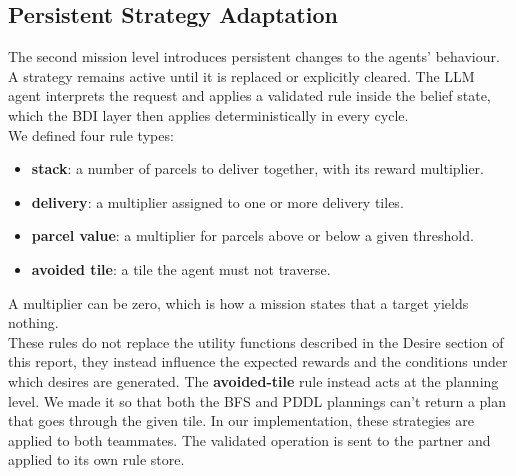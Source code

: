 \documentclass[11pt,a4paper]{article}
\begin{document}
\subsection{Persistent Strategy Adaptation}
The second mission level introduces persistent changes to the agents' behaviour.
A strategy remains active until it is replaced or explicitly cleared.
The LLM agent interprets the request and applies a validated rule inside the belief state,
which the BDI layer then applies deterministically in every cycle. 
\\We defined four rule types:
\begin{itemize}
    \item \textbf{stack}: a number of parcels to deliver together, with its reward multiplier.
    \item \textbf{delivery}: a multiplier assigned to one or more delivery tiles.
    \item \textbf{parcel value}: a multiplier for parcels above or below a given threshold.
    \item \textbf{avoided tile}: a tile the agent must not traverse.
\end{itemize}
A multiplier can be zero, which is how a mission states that a target yields nothing.
\\These rules do not replace the utility functions described in the Desire section of this report, they instead influence the expected rewards and the conditions under which desires are generated.
The \textbf{avoided-tile} rule instead acts at the planning level. We made it so that both the BFS and PDDL plannings can't return a plan that goes through the given tile.
In our implementation, these strategies are applied to both teammates.
The validated operation is sent to the partner and applied to its own rule store.
\end{document}
